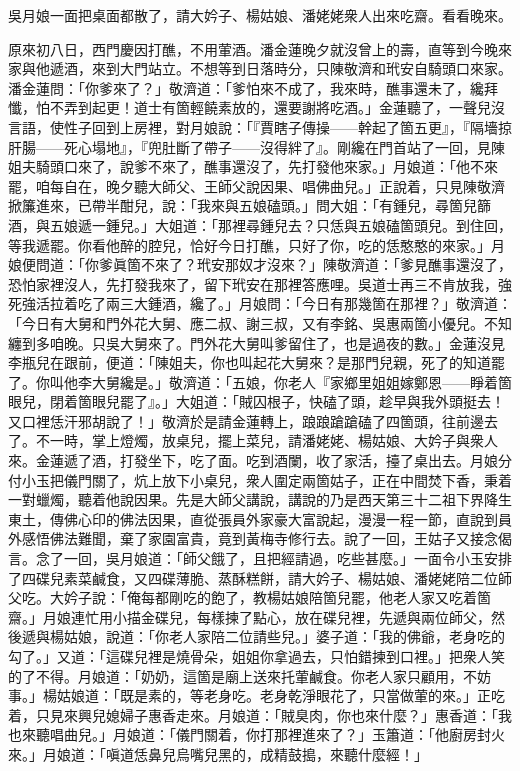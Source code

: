 吳月娘一面把桌面都散了，請大妗子、楊姑娘、潘姥姥衆人出來吃齋。看看晚來。

原來初八日，西門慶因打醮，不用葷酒。潘金蓮晚夕就沒曾上的壽，直等到今晚來家與他遞酒，來到大門站立。不想等到日落時分，只陳敬濟和玳安自騎頭口來家。潘金蓮問：「你爹來了？」敬濟道：「爹怕來不成了，我來時，醮事還未了，纔拜懺，怕不弄到起更！道士有箇輕饒素放的，還要謝將吃酒。」金蓮聽了，一聲兒沒言語，使性子回到上房裡，對月娘說：「『賈瞎子傳操——幹起了箇五更』，『隔墻掠肝腸——死心塌地』，『兜肚斷了帶子——沒得絆了』。{}剛纔在門首站了一回，見陳姐夫騎頭口來了，說爹不來了，醮事還沒了，先打發他來家。」月娘道：「他不來罷，咱每自在，晚夕聽大師父、王師父說因果、唱佛曲兒。」{}正說着，只見陳敬濟掀簾進來，已帶半酣兒，說：「我來與五娘磕頭。」問大姐：「有鍾兒，尋箇兒篩酒，與五娘遞一鍾兒。」大姐道：「那裡尋鍾兒去？只恁與五娘磕箇頭兒。到住回，等我遞罷。你看他醉的腔兒，恰好今日打醮，只好了你，吃的恁憨憨的來家。」月娘便問道：「你爹眞箇不來了？玳安那奴才沒來？」陳敬濟道：「爹見醮事還沒了，恐怕家裡沒人，先打發我來了，留下玳安在那裡答應哩。吳道士再三不肯放我，強死強活拉着吃了兩三大鍾酒，{}纔了。」月娘問：「今日有那幾箇在那裡？」敬濟道：「今日有大舅和門外花大舅、應二叔、謝三叔，又有李銘、吳惠兩箇小優兒。不知纏到多咱晚。只吳大舅來了。門外花大舅叫爹留住了，也是過夜的數。」金蓮沒見李瓶兒在跟前，便道：「陳姐夫，你也叫起花大舅來？是那門兒親，死了的知道罷了。你叫他李大舅纔是。」{}敬濟道：「五娘，你老人『家鄉里姐姐嫁鄭恩——睜着箇眼兒，閉着箇眼兒罷了』。」大姐道：「賊囚根子，快磕了頭，趁早與我外頭挺去！{}又口裡恁汗邪胡說了！」敬濟於是請金蓮轉上，踉踉蹌蹌磕了四箇頭，{}往前邊去了。不一時，掌上燈燭，放桌兒，擺上菜兒，請潘姥姥、楊姑娘、大妗子與衆人來。金蓮遞了酒，打發坐下，吃了面。吃到酒闌，收了家活，擡了桌出去。月娘分付小玉把儀門關了，炕上放下小桌兒，衆人圍定兩箇姑子，正在中間焚下香，秉着一對蠟燭，聽着他說因果。先是大師父講說，講說的乃是西天第三十二祖下界降生東土，傳佛心印的佛法因果，直從張員外家豪大富說起，漫漫一程一節，直說到員外感悟佛法難聞，棄了家園富貴，竟到黃梅寺修行去。說了一回，王姑子又接念偈言。念了一回，吳月娘道：「師父餓了，且把經請過，吃些甚麼。」一面令小玉安排了四碟兒素菜鹹食，又四碟薄脆、蒸酥糕餅，請大妗子、楊姑娘、潘姥姥陪二位師父吃。大妗子說：「俺每都剛吃的飽了，教楊姑娘陪箇兒罷，他老人家又吃着箇齋。」月娘連忙用小描金碟兒，每樣揀了點心，放在碟兒裡，先遞與兩位師父，然後遞與楊姑娘，說道：「你老人家陪二位請些兒。」婆子道：「我的佛爺，老身吃的勾了。」又道：「這碟兒裡是燒骨朵，姐姐你拿過去，只怕錯揀到口裡。」把衆人笑的了不得。月娘道：「奶奶，這箇是廟上送來托葷鹹食。你老人家只顧用，不妨事。」楊姑娘道：「既是素的，等老身吃。老身乾淨眼花了，只當做葷的來。」正吃着，只見來興兒媳婦子惠香走來。月娘道：「賊臭肉，你也來什麼？」惠香道：「我也來聽唱曲兒。」月娘道：「儀門關着，你打那裡進來了？」玉簫道：「他廚房封火來。」月娘道：「嗔道恁鼻兒烏嘴兒黑的，成精鼓搗，來聽什麼經！」{}


